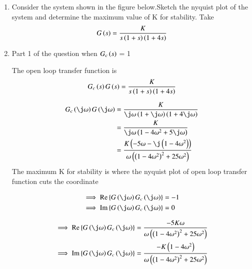 \begin{enumerate}[label=\thesubsection.\arabic*.,ref=\thesubsection.\theenumi]

\item Consider the system shown in the figure below.Sketch the nyquist plot of the system and determine the maximum value of K for stability.
Take  
\begin{align}
G\brak{s} = \frac{K}{s\brak{1+s}\brak{1+4s}}
\label{ee18btech11034_Gs}
\end{align}

\begin{figure}[!ht]
	\begin{center}
		
		\resizebox{\columnwidth}{!}{}
	\end{center}
\caption{}
\label{fig:ee18btech11034}
\end{figure}

\solution
\item Part 1 of the question when $G_{c}\left(s\right)$ = 1

The open loop transfer function is 
\begin{align}
    G_{c}\left(s\right)G\left(s\right) = \frac{K}{s\left(1+s\right)\left(1+4s\right)}
\end{align}

\begin{align}
    G_{c}\brak{\j\omega}G\brak{\j\omega} &= \frac{K}{{\j\omega}\brak{1+\j\omega}\brak{1+4\j\omega}}
    \\
    &= \frac{K}{{\j\omega}\brak{1-4\omega^2+5\j\omega}}
    \\
    &= \frac{K\brak{-5\omega-\j\brak{1-4\omega^2}}}{{\omega}\brak{\brak{1-4\omega^2}^2+25\omega^2}}
    \end{align}
The maximum K for stability is where the nyquist plot of open loop transfer function cuts the coordinate 


\begin{align}
 \implies    \text{Re} \cbrak{G\brak{\j \omega}G_{c}\brak{\j\omega}} &= -1
 \label{ee18btech11034_eq_Re}
 \\
 \implies \text{Im} \cbrak{G\brak{\j \omega}G_{c}\brak{\j\omega}} &= 0
 \label{ee18btech11034_eq_Im}
\end{align}

\begin{align}
 \implies    \text{Re} \cbrak{G\brak{\j \omega}G_{c}\brak{\j\omega}} &= \frac{-5K\omega}{{\omega}\brak{\brak{1-4\omega^2}^2+25\omega^2}}
 \label{ee18btech11034_eq_1_Re}
 \\
 \implies \text{Im} \cbrak{G\brak{\j \omega}G_{c}\brak{\j\omega}} &= \frac{-K\brak{1-4\omega^2}}{{\omega}\brak{\brak{1-4\omega^2}^2+25\omega^2}}
 \label{ee18btech11034_eq_1_Im}
\end{align}


\end{enumerate}
